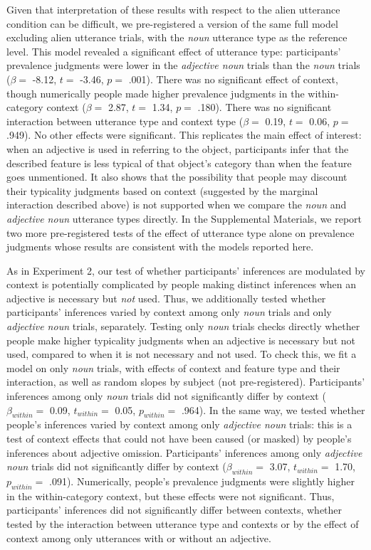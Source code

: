 \documentclass[
  english,
  man,floatsintext]{apa6}
\begin{document}
Given that interpretation of these results with respect to the alien utterance condition can be difficult, we pre-registered a version of the same full model excluding alien utterance trials, with the \emph{noun} utterance type as the reference level. This model revealed a significant effect of utterance type: participants' prevalence judgments were lower in the \emph{adjective noun} trials than the \emph{noun} trials (\(\beta =\) -8.12, \(t =\) -3.46, \(p =\) .001). There was no significant effect of context, though numerically people made higher prevalence judgments in the within-category context (\(\beta =\) 2.87, \(t =\) 1.34, \(p =\) .180). There was no significant interaction between utterance type and context type (\(\beta =\) 0.19, \(t =\) 0.06, \(p =\) .949). No other effects were significant. This replicates the main effect of interest: when an adjective is used in referring to the object, participants infer that the described feature is less typical of that object's category than when the feature goes unmentioned. It also shows that the possibility that people may discount their typicality judgments based on context (suggested by the marginal interaction described above) is not supported when we compare the \emph{noun} and \emph{adjective noun} utterance types directly. In the Supplemental Materials, we report two more pre-registered tests of the effect of utterance type alone on prevalence judgments whose results are consistent with the models reported here.

As in Experiment 2, our test of whether participants' inferences are modulated by context is potentially complicated by people making distinct inferences when an adjective is necessary but \emph{not} used. Thus, we additionally tested whether participants' inferences varied by context among only \emph{noun} trials and only \emph{adjective noun} trials, separately. Testing only \emph{noun} trials checks directly whether people make higher typicality judgments when an adjective is necessary but not used, compared to when it is not necessary and not used. To check this, we fit a model on only \emph{noun} trials, with effects of context and feature type and their interaction, as well as random slopes by subject (not pre-registered). Participants' inferences among only \emph{noun} trials did not significantly differ by context (\(\beta_{within} =\) 0.09, \(t_{within} =\) 0.05, \(p_{within} =\) .964). In the same way, we tested whether people's inferences varied by context among only \emph{adjective noun} trials: this is a test of context effects that could not have been caused (or masked) by people's inferences about adjective omission. Participants' inferences among only \emph{adjective noun} trials did not significantly differ by context (\(\beta_{within} =\) 3.07, \(t_{within} =\) 1.70, \(p_{within} =\) .091). Numerically, people's prevalence judgments were slightly higher in the within-category context, but these effects were not significant. Thus, participants' inferences did not significantly differ between contexts, whether tested by the interaction between utterance type and contexts or by the effect of context among only utterances with or without an adjective.
\end{document}
